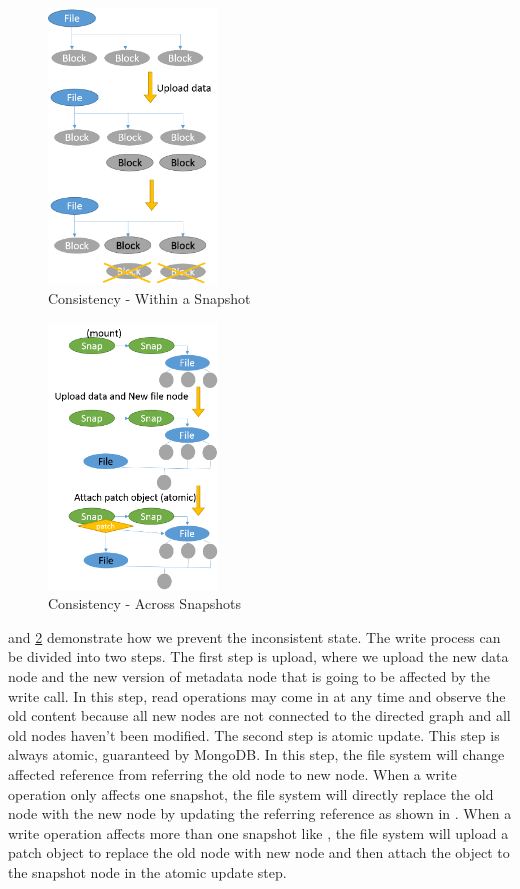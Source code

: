 \begin{figure}[t]
\centering
\includegraphics[width=0.4\textwidth]{Chapter-3/figs/fig27.png}
\caption{Consistency - Within a Snapshot}
\label{fig:consist1}
\end{figure}

\begin{figure}[t]
\centering
\includegraphics[width=0.4\textwidth]{Chapter-3/figs/fig28.png}
\caption{Consistency - Across Snapshots}
\label{fig:consist2}
\end{figure}

     and \ref{fig:consist2} demonstrate how we prevent the inconsistent state. The write process can be divided into two steps. The first step is upload, where we upload the new data node and the new version of metadata node that is going to be affected by the write call. In this step, read operations may come in at any time and observe the old content because all new nodes are not connected to the directed graph and all old nodes haven't been modified. The second step is atomic update. This step is always atomic, guaranteed by MongoDB. In this step, the file system will change affected reference from referring the old node to new node. When a write operation only affects one snapshot, the file system will directly replace the old node with the new node by updating the referring reference as shown in . When a write operation affects more than one snapshot like , the file system will upload a patch object to replace the old node with new node and then attach the object to the snapshot node in the atomic update step.

